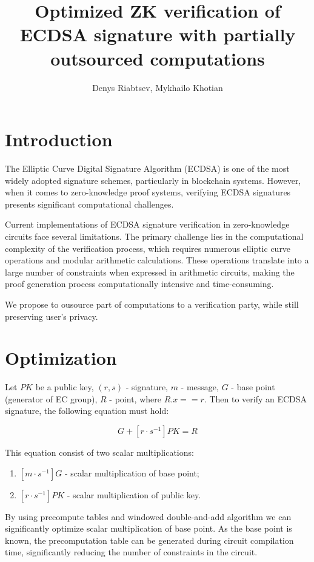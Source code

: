\documentclass{iacrtrans}
\author{Denys Riabtsev, Mykhailo Khotian}
\institute{Distributed Lab}
\title{Optimized ZK verification of ECDSA signature with partially outsourced computations}
\begin{document}
\maketitle


\section{Introduction}
The Elliptic Curve Digital Signature Algorithm (ECDSA) is one of the most widely adopted signature schemes, particularly in blockchain systems. 
However, when it comes to zero-knowledge proof systems, verifying ECDSA signatures presents significant computational challenges.

Current implementations of ECDSA signature verification in zero-knowledge circuits face several limitations. 
The primary challenge lies in the computational complexity of the verification process, which requires numerous elliptic curve operations and modular arithmetic calculations. 
These operations translate into a large number of constraints when expressed in arithmetic circuits, making the proof generation process computationally intensive and time-consuming.

We propose to ousource part of computations to a verification party, while still preserving user's privacy.



\section{Optimization}
Let $PK$ be a public key, $(r, s)$ - signature, $m$ - message, $G$ - base point (generator of EC group), $R$ - point, where $R.x == r$.
Then to verify an ECDSA signature, the following equation must hold:

\begin{equation}
    [m \cdot s^{-1}] G + [r \cdot s^{-1}] PK = R
\end{equation}

This equation consist of two scalar multiplications:
\begin{enumerate}
    \item $[m \cdot s^{-1}] G$ - scalar multiplication of base point;
    \item $[r \cdot s^{-1}] PK$ - scalar multiplication of public key.
\end{enumerate}

By using precompute tables and windowed double-and-add algorithm we can significantly optimize scalar multiplication of base point.
As the base point is known, the precomputation table can be generated during circuit compilation time, significantly reducing the number 
of constraints in the circuit.
\end{document}
